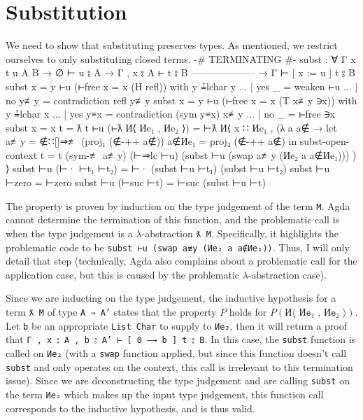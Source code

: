 \documentclass[logo,bsc,singlespacing,parskip,online]{infthesis}
\renewenvironment{code}{\mintedcopy[breaklines,breaksymbolleft=\;]{agda}}{\endmintedcopy}
\begin{document}
\section{Substitution}
We need to show that substituting preserves types. As mentioned, we restrict ourselves to only
substituting closed terms.
\begin{code}
{-# TERMINATING #-}
subst : ∀ {Γ x t u A B}
  → ∅ ⊢ u ⦂ A
  → Γ , x ⦂ A ⊢ t ⦂ B
    --------------------
  → Γ ⊢ [ x := u ] t ⦂ B
subst {x = y} ⊢u (⊢free {x = x} (H refl)) with y ≟lchar y
... | yes _   = weaken ⊢u
... | no  y≢y = contradiction refl y≢y
subst {x = y} ⊢u (⊢free {x = x} (T x≢y ∋x)) with y ≟lchar x
... | yes y≡x = contradiction (sym y≡x) x≢y
... | no  _   = ⊢free ∋x
subst {x = x} {t = ƛ t} ⊢u (⊢ƛ И⟨ Иe₁ , Иe₂ ⟩) =
  ⊢ƛ И⟨ x ∷ Иe₁
      , (λ a {a∉} →
        let a≢y   = ∉∷[]⇒≢ (proj₁ (∉-++ a∉))
            a∉Иe₁ = proj₂ (∉-++ a∉)
        in subst-open-context
          {t = t}
          (sym-≢ a≢y)
          (⊢⇒lc ⊢u)
          (subst ⊢u (swap a≢y (Иe₂ a {a∉Иe₁}))) )
      ⟩
subst ⊢u (⊢· ⊢t₁ ⊢t₂) = ⊢· (subst ⊢u ⊢t₁) (subst ⊢u ⊢t₂)
subst ⊢u ⊢zero = ⊢zero
subst ⊢u (⊢suc ⊢t) = ⊢suc (subst ⊢u ⊢t)
\end{code}

The property is proven by induction on the type judgement of the term \texttt{M}. Agda cannot
determine the termination of this function, and the problematic call is when the type judgement is a
$\lambda$-abstraction \texttt{ƛ M}. Specifically, it highlights the problematic code to be
\texttt{subst ⊢u (swap a≢y (Иe₂ a {a∉Иe₁}))}. Thus, I will only detail that step (technically, Agda
also complains about a problematic call for the application case, but this is caused by the
problematic $\lambda$-abstraction case).

Since we are inducting on the type judgement, the inductive hypothesis for a term \texttt{ƛ M} of
type \texttt{A ⇒ A'} states that the property $P$ holds for $P(\texttt{И⟨ Иe₁ , Иe₂ ⟩})$. Let
\texttt{b} be an appropriate \texttt{List Char} to supply to \texttt{Иe₂}, then it will return a
proof that \texttt{Γ , x ⦂ A , b ⦂ A' ⊢ [ 0 —→ b ] t ⦂ B}. In this case, the \texttt{subst} function
is called on \texttt{Иe₂} (with a \texttt{swap} function applied, but since this function doesn't
call \texttt{subst} and only operates on the context, this call is irrelevant to this termination
issue). Since we are deconstructing the type judgement and are calling \texttt{subst} on the term
\texttt{Иe₂} which makes up the input type judgement, this function call corresponds to the
inductive hypothesis, and is thus valid.
\end{document}
